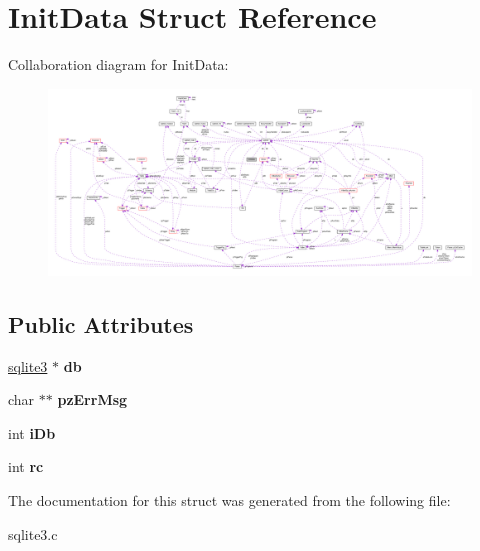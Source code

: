 \hypertarget{structInitData}{}\section{Init\+Data Struct Reference}
\label{structInitData}


Collaboration diagram for Init\+Data\+:\nopagebreak
\begin{figure}[H]
\begin{center}
\leavevmode
\includegraphics[width=350pt]{structInitData__coll__graph}
\end{center}
\end{figure}
\subsection*{Public Attributes}
\begin{DoxyCompactItemize}
\item 
\hyperlink{structsqlite3}{sqlite3} $\ast$ {\bfseries db}\hypertarget{structInitData_adc9e29c56e0392076e92d7f4b29fa272}{}\label{structInitData_adc9e29c56e0392076e92d7f4b29fa272}

\item 
char $\ast$$\ast$ {\bfseries pz\+Err\+Msg}\hypertarget{structInitData_aa8aef34241ec214f038b38932ffe1357}{}\label{structInitData_aa8aef34241ec214f038b38932ffe1357}

\item 
int {\bfseries i\+Db}\hypertarget{structInitData_ad6c7953b49d351cd9fb14e3394010689}{}\label{structInitData_ad6c7953b49d351cd9fb14e3394010689}

\item 
int {\bfseries rc}\hypertarget{structInitData_a627153a3de2c4d159ae44ebc03961592}{}\label{structInitData_a627153a3de2c4d159ae44ebc03961592}

\end{DoxyCompactItemize}


The documentation for this struct was generated from the following file\+:\begin{DoxyCompactItemize}
\item 
sqlite3.\+c\end{DoxyCompactItemize}
